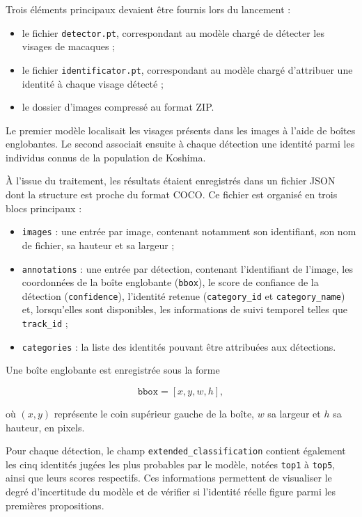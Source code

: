 \documentclass[11pt,a4paper]{report}
\begin{document}
Trois éléments principaux devaient être fournis lors du lancement :

\begin{itemize}
    \item le fichier \texttt{detector.pt}, correspondant au modèle chargé de
    détecter les visages de macaques ;
    \item le fichier \texttt{identificator.pt}, correspondant au modèle chargé
    d'attribuer une identité à chaque visage détecté ;
    \item le dossier d'images compressé au format ZIP.
\end{itemize}

Le premier modèle localisait les visages présents dans les images à l'aide de
boîtes englobantes. Le second associait ensuite à chaque détection une identité
parmi les individus connus de la population de Koshima.

À l'issue du traitement, les résultats étaient enregistrés dans un fichier JSON
dont la structure est proche du format COCO. Ce fichier est organisé en trois
blocs principaux :

\begin{itemize}
    \item \texttt{images} : une entrée par image, contenant notamment son
    identifiant, son nom de fichier, sa hauteur et sa largeur ;

    \item \texttt{annotations} : une entrée par détection, contenant
    l'identifiant de l'image, les coordonnées de la boîte englobante
    (\texttt{bbox}), le score de confiance de la détection
    (\texttt{confidence}), l'identité retenue
    (\texttt{category\_id} et \texttt{category\_name}) et, lorsqu'elles sont
    disponibles, les informations de suivi temporel telles que
    \texttt{track\_id} ;

    \item \texttt{categories} : la liste des identités pouvant être attribuées
    aux détections.
\end{itemize}

Une boîte englobante est enregistrée sous la forme

\begin{equation}
    \texttt{bbox}=[x,y,w,h],
\end{equation}

où $(x,y)$ représente le coin supérieur gauche de la boîte, $w$ sa largeur et
$h$ sa hauteur, en pixels.

Pour chaque détection, le champ
\texttt{extended\_classification} contient également les cinq identités jugées
les plus probables par le modèle, notées \texttt{top1} à \texttt{top5}, ainsi
que leurs scores respectifs. Ces informations permettent de visualiser le degré
d'incertitude du modèle et de vérifier si l'identité réelle figure parmi les
premières propositions.
\end{document}
